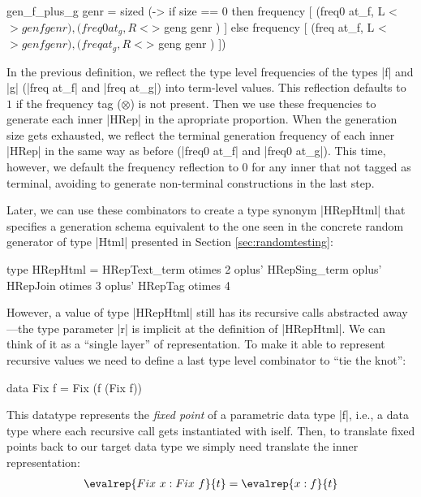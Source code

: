\begin{code}
  gen_f_plus_g genr  = sized (\size ->
    if size == 0
    then frequency
      [ (freq0  at_f,  L  <$> genf  genr  )
      , (freq0  at_g,  R  <$> geng  genr  ) ]
    else frequency
      [ (freq   at_f,  L  <$> genf  genr  )
      , (freq   at_g,  R  <$> geng  genr  ) ])
\end{code} %

In the previous definition, we reflect the type level frequencies of the types
|f| and |g| (|freq at_f| and |freq at_g|) into term-level values.
%
This reflection defaults to $1$ if the frequency tag ($\otimes$) is not present.
%
Then we use these frequencies to generate each inner |HRep| in the apropriate
proportion.
%
When the generation size gets exhausted, we reflect the terminal generation
frequency of each inner |HRep| in the same way as before (|freq0 at_f| and
|freq0 at_g|).
%
This time, however, we default the frequency reflection to $0$ for any inner
that not tagged as terminal, avoiding to generate non-terminal constructions in
the last step.


Later, we can use these combinators to create a type synonym |HRepHtml| that
specifies a generation schema equivalent to the one seen in the concrete random
generator of type |Html| presented in Section \ref{sec:randomtesting}:

\begin{code}
type HRepHtml  =       HRepText_term  otimes 2
               oplus'  HRepSing_term
               oplus'  HRepJoin       otimes 3
               oplus'  HRepTag        otimes 4
\end{code}

However, a value of type |HRepHtml| still has its recursive calls abstracted
away---the type parameter |r| is implicit at the definition of |HRepHtml|.
%
We can think of it as a ``single layer'' of representation.
%
To make it able to represent recursive values we need to define a last type
level combinator to ``tie the knot'':

\begin{code}
  data Fix f = Fix (f (Fix f))
\end{code}

This datatype represents the \emph{fixed point} of a parametric data type |f|,
i.e., a data type where each recursive call gets instantiated with iself.
%
Then, to translate fixed points back to our target data type we simply need
translate the inner representation:
%
\begin{align*}
  \evalrep{Fix\ x : Fix\ f}{t} = \evalrep{x : f}{t}
\end{align*}

